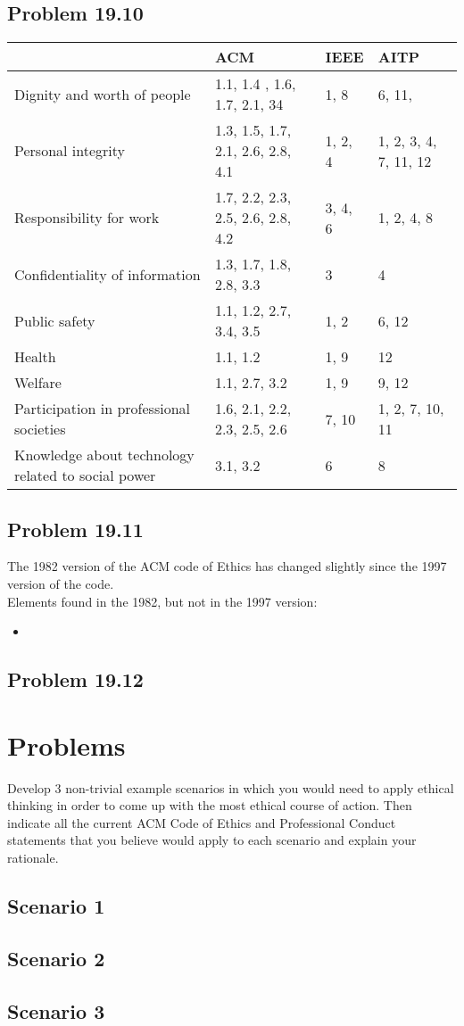 \documentclass[14pt]{article}
\begin{document}
\subsection{Problem 19.10}
{\renewcommand{\arraystretch}{2}%
  \begin{tabular}{|l|l|l|l|}
    \cline{2-4}
    \multicolumn{1}{r|}{}& ACM & IEEE & AITP \\ \hline
    Dignity and worth of people & 1.1, 1.4 , 1.6, 1.7, 2.1, 34 & 1, 8 & 6, 11, \\ \hline
    Personal integrity & 1.3, 1.5, 1.7, 2.1, 2.6, 2.8, 4.1 & 1, 2, 4 & 1, 2, 3, 4, 7, 11, 12 \\ \hline
    Responsibility for work & 1.7, 2.2, 2.3, 2.5, 2.6, 2.8, 4.2 & 3, 4, 6 & 1, 2, 4, 8 \\ \hline
    Confidentiality of information & 1.3, 1.7, 1.8, 2.8, 3.3 & 3 & 4 \\ \hline
    Public safety & 1.1, 1.2, 2.7, 3.4, 3.5 & 1, 2 & 6, 12 \\ \hline
    Health & 1.1, 1.2 & 1, 9 & 12 \\ \hline
    Welfare & 1.1, 2.7, 3.2 & 1, 9 & 9, 12 \\ \hline
    Participation in professional societies & 1.6, 2.1, 2.2, 2.3, 2.5, 2.6 & 7, 10 & 1, 2, 7, 10, 11 \\ \hline
    Knowledge about technology related to social power & 3.1, 3.2 & 6 & 8 \\ \hline
  \end{tabular}}
\newpage
\subsection{Problem 19.11}
The 1982 version of the ACM code of Ethics has changed slightly since the 1997 version of the code.\\
Elements found in the 1982, but not in the 1997 version:\\
	\begin{itemize}
		\item 
	\end{itemize}
\newpage
\subsection{Problem 19.12}

\newpage

\section{Problems}
Develop 3 non-trivial example scenarios in which you would need to apply ethical thinking in order to come up with the most ethical course of action. Then indicate all the current ACM Code of Ethics and Professional Conduct statements that you believe would apply to each scenario and explain your rationale.
\subsection{Scenario 1}

\newpage
\subsection{Scenario 2}

\newpage
\subsection{Scenario 3}


\newpage


\end{document}
